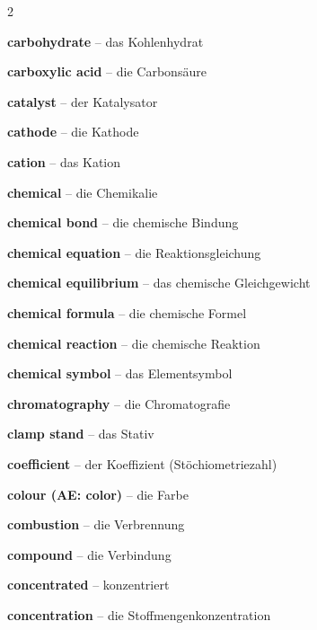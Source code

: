 \begin{multicols}{2}
\par\nopagebreak
\textbf{carbohydrate} -- das Kohlenhydrat\dotfill\hyperref[e:241]{\pageref*{e:241}}\par
\textbf{carboxylic acid} -- die Carbonsäure\dotfill\hyperref[e:223]{\pageref*{e:223}}\par
\textbf{catalyst} -- der Katalysator\dotfill\hyperref[e:142]{\pageref*{e:142}}\par
\textbf{cathode} -- die Kathode\dotfill\hyperref[e:199]{\pageref*{e:199}}\par
\textbf{cation} -- das Kation\dotfill\hyperref[e:94]{\pageref*{e:94}}\par
\textbf{chemical} -- die Chemikalie\dotfill\hyperref[e:64]{\pageref*{e:64}}\par
\textbf{chemical bond} -- die chemische Bindung\dotfill\hyperref[e:105]{\pageref*{e:105}}\par
\textbf{chemical equation} -- die Reaktionsgleichung\dotfill\hyperref[e:129]{\pageref*{e:129}}\par
\textbf{chemical equilibrium} -- das chemische Gleichgewicht\dotfill\hyperref[e:145]{\pageref*{e:145}}\par
\textbf{chemical formula} -- die chemische Formel\dotfill\hyperref[e:101]{\pageref*{e:101}}\par
\textbf{chemical reaction} -- die chemische Reaktion\dotfill\hyperref[e:125]{\pageref*{e:125}}\par
\textbf{chemical symbol} -- das Elementsymbol\dotfill\hyperref[e:84]{\pageref*{e:84}}\par
\textbf{chromatography} -- die Chromatografie\dotfill\hyperref[e:38]{\pageref*{e:38}}\par
\textbf{clamp stand} -- das Stativ\dotfill\hyperref[e:56]{\pageref*{e:56}}\par
\textbf{coefficient} -- der Koeffizient (Stöchiometriezahl)\dotfill\hyperref[e:131]{\pageref*{e:131}}\par
\textbf{colour (AE: color)} -- die Farbe\dotfill\hyperref[e:21]{\pageref*{e:21}}\par
\textbf{combustion} -- die Verbrennung\dotfill\hyperref[e:135]{\pageref*{e:135}}\par
\textbf{compound} -- die Verbindung\dotfill\hyperref[e:4]{\pageref*{e:4}}\par
\textbf{concentrated} -- konzentriert\dotfill\hyperref[e:170]{\pageref*{e:170}}\par
\textbf{concentration} -- die Stoffmengenkonzentration\dotfill\hyperref[e:255]{\pageref*{e:255}}\par

\end{multicols}
